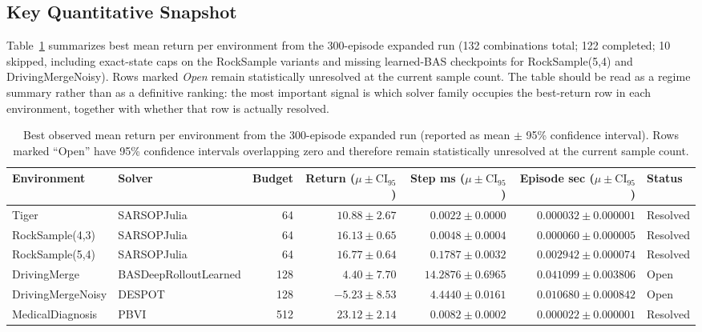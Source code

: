 \documentclass[10pt,twocolumn]{article}
\begin{document}
\subsection{Key Quantitative Snapshot}
Table~\ref{tab:best} summarizes best mean return per environment from the 300-episode expanded run (132 combinations total; 122 completed; 10 skipped, including exact-state caps on the RockSample variants and missing learned-BAS checkpoints for RockSample(5,4) and DrivingMergeNoisy). Rows marked \emph{Open} remain statistically unresolved at the current sample count. The table should be read as a regime summary rather than as a definitive ranking: the most important signal is which solver family occupies the best-return row in each environment, together with whether that row is actually resolved.

\begin{table}[t]
\centering
\caption{Best observed mean return per environment from the 300-episode expanded run (reported as mean $\pm$ 95\% confidence interval). Rows marked ``Open'' have 95\% confidence intervals overlapping zero and therefore remain statistically unresolved at the current sample count.}
\label{tab:best}
\small
\begin{tabular}{l l r r r r l}
\toprule
Environment & Solver & Budget & Return ($\mu\pm\mathrm{CI}_{95}$) & Step ms ($\mu\pm\mathrm{CI}_{95}$) & Episode sec ($\mu\pm\mathrm{CI}_{95}$) & Status \\
\midrule
Tiger & SARSOPJulia & 64 & $10.88\pm2.67$ & $0.0022\pm0.0000$ & $0.000032\pm0.000001$ & Resolved \\
RockSample(4,3) & SARSOPJulia & 64 & $16.13\pm0.65$ & $0.0048\pm0.0004$ & $0.000060\pm0.000005$ & Resolved \\
RockSample(5,4) & SARSOPJulia & 64 & $16.77\pm0.64$ & $0.1787\pm0.0032$ & $0.002942\pm0.000074$ & Resolved \\
DrivingMerge & BASDeepRolloutLearned & 128 & $4.40\pm7.70$ & $14.2876\pm0.6965$ & $0.041099\pm0.003806$ & Open \\
DrivingMergeNoisy & DESPOT & 128 & $-5.23\pm8.53$ & $4.4440\pm0.0161$ & $0.010680\pm0.000842$ & Open \\
MedicalDiagnosis & PBVI & 512 & $23.12\pm2.14$ & $0.0082\pm0.0002$ & $0.000022\pm0.000001$ & Resolved \\
\bottomrule
\end{tabular}
\end{table}
\end{document}
